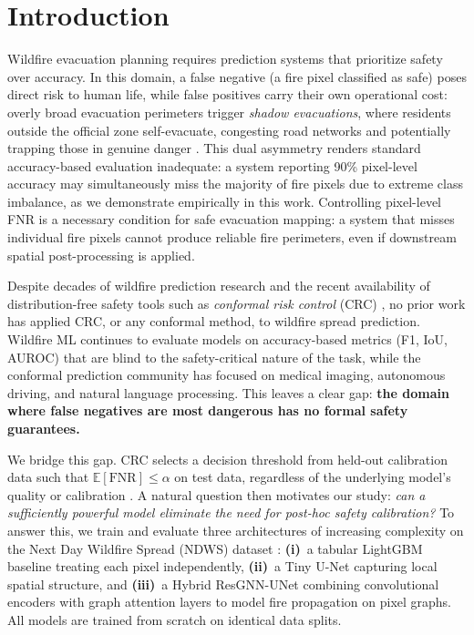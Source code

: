 \documentclass{article}
\begin{document}

\section{Introduction}

Wildfire evacuation planning requires prediction systems that prioritize safety over accuracy.
In this domain, a false negative (a fire pixel classified as safe) poses direct risk to human life, while false positives carry their own operational cost: overly broad evacuation perimeters trigger \emph{shadow evacuations}, where residents outside the official zone self-evacuate, congesting road networks and potentially trapping those in genuine danger \citep{zhao2022evacuation}.
This dual asymmetry renders standard accuracy-based evaluation inadequate: a system reporting 90\% pixel-level accuracy may simultaneously miss the majority of fire pixels due to extreme class imbalance, as we demonstrate empirically in this work.
Controlling pixel-level FNR is a necessary condition for safe evacuation mapping: a system that misses individual fire pixels cannot produce reliable fire perimeters, even if downstream spatial post-processing is applied.

Despite decades of wildfire prediction research \citep{jain2020review} and the recent availability of distribution-free safety tools such as \emph{conformal risk control} (CRC) \citep{angelopoulos2022conformal}, no prior work has applied CRC, or any conformal method, to wildfire spread prediction.
Wildfire ML continues to evaluate models on accuracy-based metrics (F1, IoU, AUROC) that are blind to the safety-critical nature of the task, while the conformal prediction community has focused on medical imaging, autonomous driving, and natural language processing.
This leaves a clear gap: \textbf{the domain where false negatives are most dangerous has no formal safety guarantees.}

We bridge this gap.
CRC selects a decision threshold from held-out calibration data such that $\mathbb{E}[\mathrm{FNR}] \le \alpha$ on test data, regardless of the underlying model's quality or calibration \citep{angelopoulos2021gentle}.
A natural question then motivates our study: \emph{can a sufficiently powerful model eliminate the need for post-hoc safety calibration?}
To answer this, we train and evaluate three architectures of increasing complexity on the Next Day Wildfire Spread (NDWS) dataset \citep{huot2022next}:
\textbf{(i)}~a tabular LightGBM baseline \citep{ke2017lightgbm} treating each pixel independently,
\textbf{(ii)}~a Tiny U-Net \citep{ronneberger2015unet} capturing local spatial structure, and
\textbf{(iii)}~a Hybrid ResGNN-UNet combining convolutional encoders with graph attention layers \citep{veličković2018graph} to model fire propagation on pixel graphs.
All models are trained from scratch on identical data splits.
\end{document}
